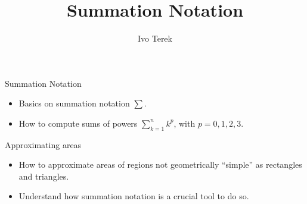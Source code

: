 \documentclass{ximera}
\author{Ivo Terek}
\title{Summation Notation}
\begin{document}
\begin{abstract}
\end{abstract}
\maketitle


\begin{objectives}
\item Summation Notation
\begin{itemize}
	\item Basics on summation notation $\sum$.
	\item How to compute sums of powers $\sum_{k=1}^n k^p$, with $p=0,1,2,3$.
\end{itemize}

\item Approximating areas
\begin{itemize}
	\item How to approximate areas of regions not geometrically ``simple'' as rectangles and triangles.
	\item Understand how summation notation is a crucial tool to do so.
\end{itemize}


\end{objectives}
\end{document}
